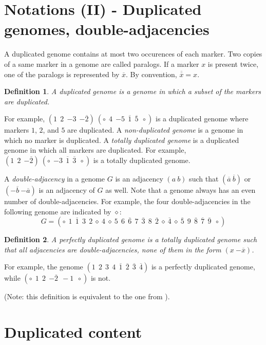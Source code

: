 \documentclass[11pt,final,twoside,nofrench]{thlifl}
\newcommand{\fst}[1]{ \ensuremath{#1} }
\newcommand{\snd}[1]{ \ensuremath{\overline{#1}} }
\newcommand{\msnd}[1]{ \ensuremath{{-\overline{#1}}} }
\newcommand\aff[2]{\ensuremath{(\fst{#1}~\fst{#2})}}
\newcommand\ass[2]{\ensuremath{(\snd{#1}~\snd{#2})}}
\newcommand\mss[2]{\ensuremath{(\msnd{#1}~\msnd{#2})}}
\newtheorem{definition}{Definition}
\begin{document}
\clearpage

\section{Notations (II) - Duplicated genomes, double-adjacencies}
\label{sec:notations2}

A duplicated genome contains at most two occurences of each marker.  Two copies of a same marker in a genome are called paralogs. If a marker $x$ is present twice, one of the paralogs is represented by $\snd{x}$. By convention, $\snd{\snd{x}}= x$. 

\begin{definition}
A \emph{duplicated genome} is a genome in which a subset of the markers are duplicated. 
\end{definition}

For example,  
$(1~~2~~{-3}~~\msnd{2}) ~ (\circ~~4~~{-5}~~\snd{1}~~\snd{5}~~\circ)$ is a duplicated genome  where markers $1$, $2$, and  $5$ are duplicated. A \emph{non-duplicated genome} is a genome in which no marker is duplicated. 
A \emph{totally duplicated genome} is a duplicated genome in which all markers are duplicated. For example,  
$(1~~2~~\msnd{2}) ~ (\circ~~{-3}~~\snd{1}~~\snd{3}~~\circ)$ is a totally duplicated genome.

A \emph{double-adjacency} in a genome $G$ is an adjacency $\aff{a}{b}$
such that $\ass{a}{b}$ or $\mss{b}{a}$ is an adjacency of $G$ as
well. Note that a genome always has an even number of
double-adjacencies.  For example, the four double-adjacencies in the
following genome are indicated by $\diamond$:
$$G =
(\circ~~\fst{1}~~\snd{1}~~\fst{3}~~\fst{2}~\diamond~\fst{4}~\diamond~\fst{5}~~\fst{6}
~~\snd{6}~~\fst{7}~~\snd{3}~~\fst{8}~~\snd{2}~\diamond~\snd{4}~\diamond~\snd{5}~~\fst{
9}~~\snd{8}~~\snd{7}~~\snd{9}~~\circ )$$

\begin{definition}
A \emph{perfectly duplicated genome} is a totally duplicated genome such that
all adjacencies are double-adjacencies, none of them in the form $(x~\msnd{x})$.
\end{definition}

For example, the genome $(1~~{2}~~{3}~~4~~\snd{1}~~\snd{2}~~\snd{3}~~\snd{4})$
is a perfectly duplicated genome, while $(\circ~~1~~2~~\msnd{2}~~-1~~\circ)$ is not.

(Note: this definition is equivalent to the one from \cite{Mixtacki08}).

\section{Duplicated content}
\end{document}
